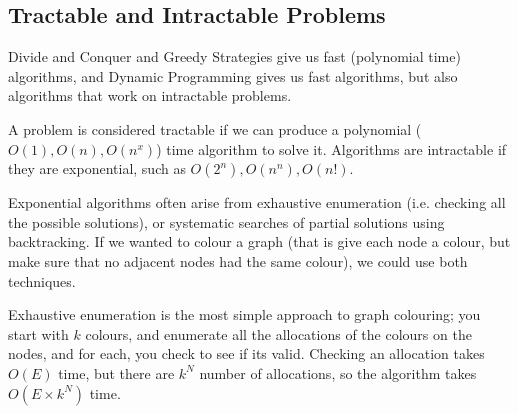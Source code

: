 \subsection{Tractable and Intractable Problems}

Divide and Conquer and Greedy Strategies give us fast (polynomial time)
algorithms, and Dynamic Programming gives us fast algorithms, but also
algorithms that work on intractable problems.

A problem is considered tractable if we can produce a polynomial ($O(1), O(n),
O(n^x)$) time algorithm to solve it. Algorithms are intractable if they are
exponential, such as $O(2^n), O(n^n), O(n!)$.

Exponential algorithms often arise from exhaustive enumeration (i.e. checking
all the possible solutions), or systematic searches of partial solutions using
backtracking. If we wanted to colour a graph (that is give each node a colour,
but make sure that no adjacent nodes had the same colour), we could use both
techniques.

Exhaustive enumeration is the most simple approach to graph colouring; you start
with $k$ colours, and enumerate all the allocations of the colours on the nodes,
and for each, you check to see if its valid. Checking an allocation takes $O(E)$
time,  but
there are $k^N$ number of allocations, so the algorithm takes $O(E \times k^N)$
time.
